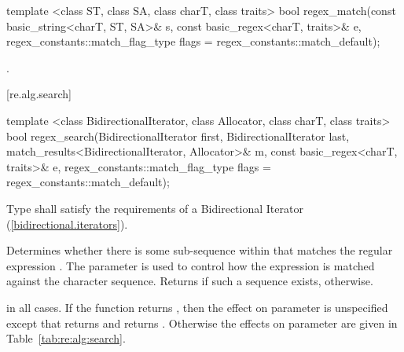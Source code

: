 \begin{itemdescr}
\pnum
\returns  {}
\end{itemdescr}

%
\begin{itemdecl}
template <class ST, class SA, class charT, class traits>
  bool regex_match(const basic_string<charT, ST, SA>& s,
                   const basic_regex<charT, traits>& e,
                   regex_constants::match_flag_type flags =
                     regex_constants::match_default); 
\end{itemdecl}

\begin{itemdescr}
\pnum
\returns  {}.
\end{itemdescr}

[re.alg.search]{}

%
\begin{itemdecl}
template <class BidirectionalIterator, class Allocator, class charT, class traits>
  bool regex_search(BidirectionalIterator first, BidirectionalIterator last,
                    match_results<BidirectionalIterator, Allocator>& m,
                    const basic_regex<charT, traits>& e,
                    regex_constants::match_flag_type flags =
                      regex_constants::match_default); 
\end{itemdecl}

\begin{itemdescr}
\pnum
\requires Type  shall satisfy the requirements of a Bidirectional
Iterator (\ref{bidirectional.iterators}).

\pnum
\effects Determines whether there is some sub-sequence within  that matches
the regular expression . The parameter  is used to control how the
expression is matched against the character sequence. Returns  if such a sequence
exists,  otherwise.

\pnum
\postconditions
{} in all cases.
If the function returns , then the effect
on parameter  is unspecified except that 
returns  and  returns .  Otherwise 
the effects on parameter  are given in Table~\ref{tab:re:alg:search}.
\end{itemdescr}

